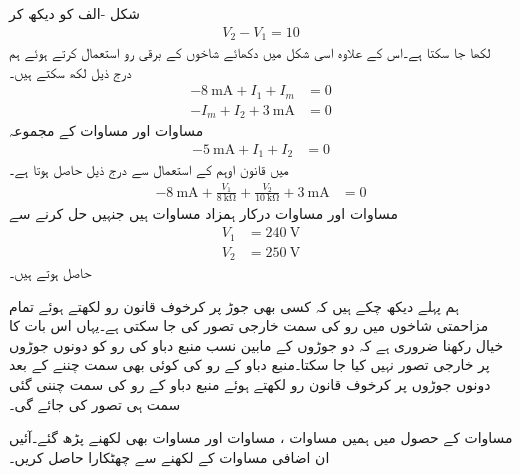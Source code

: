 شکل -الف کو دیکھ کر
\begin{align}\label{مساوات_جوڑ_منبع_دباو_درمیان_جوڑ_الف}
V_2-V_1=10
\end{align}
لکھا جا سکتا ہے۔اس کے علاوہ اسی شکل میں دکھائے شاخوں کے برقی رو استعمال کرتے ہوئے ہم درج ذیل لکھ سکتے ہیں۔
\begin{align}
-\SI{8}{\milli\ampere}+I_1+I_m&=0 \label{مساوات_جوڑ_منبع_دباو_درمیان_جوڑ_ب}\\
-I_m+I_2+\SI{3}{\milli\ampere}&=0 \label{مساوات_جوڑ_منبع_دباو_درمیان_جوڑ_پ}
\end{align}
مساوات  اور مساوات  کے مجموعہ
\begin{align}\label{مساوات_جوڑ_منبع_دباو_درمیان_جوڑ_ت}
-\SI{5}{\milli\ampere}+I_1+I_2&=0
\end{align}
میں قانون اوہم کے استعمال سے درج ذیل حاصل ہوتا ہے۔
\begin{align}\label{مساوات_جوڑ_منبع_دباو_درمیان_جوڑ_ٹ}
-\SI{8}{\milli\ampere}+\frac{V_1}{\SI{8}{\kilo\ohm}}+\frac{V_2}{\SI{10}{\kilo\ohm}}+\SI{3}{\milli\ampere}&=0
\end{align}
مساوات  اور مساوات  درکار ہمزاد مساوات ہیں جنہیں حل کرنے سے
\begin{align*}
V_1&=\SI{240}{\volt}\\
V_2&=\SI{250}{\volt}
\end{align*}
حاصل ہوتے ہیں۔

ہم پہلے دیکھ چکے ہیں کہ کسی بھی جوڑ پر کرخوف قانون رو لکھتے ہوئے تمام مزاحمتی شاخوں میں رو کی سمت خارجی تصور کی جا سکتی ہے۔یہاں اس بات کا خیال رکھنا ضروری ہے کہ دو جوڑوں کے مابین نسب منبع دباو کی رو کو دونوں جوڑوں پر خارجی تصور نہیں کیا جا سکتا۔منبع دباو کے رو کی کوئی بھی سمت چننے کے بعد دونوں جوڑوں پر کرخوف قانون رو لکھتے ہوئے  منبع دباو کے رو کی  سمت چننی گئی سمت ہی تصور کی جائے گی۔

 مساوات  کے حصول میں ہمیں مساوات ، مساوات  اور مساوات  بھی لکھنے پڑھ گئے۔آئیں ان اضافی مساوات کے لکھنے سے چھٹکارا حاصل کریں۔

